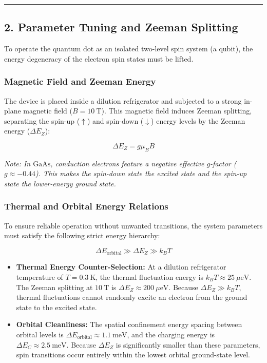 \documentclass[
]{article}
\providecommand{\tightlist}{%
  \setlength{\itemsep}{0pt}\setlength{\parskip}{0pt}}
\begin{document}
\begin{center}\rule{0.5\linewidth}{0.5pt}\end{center}

\subsection{2. Parameter Tuning and Zeeman
Splitting}\label{parameter-tuning-and-zeeman-splitting}

To operate the quantum dot as an isolated two-level spin system (a
qubit), the energy degeneracy of the electron spin states must be
lifted.

\subsubsection{Magnetic Field and Zeeman
Energy}\label{magnetic-field-and-zeeman-energy}

The device is placed inside a dilution refrigerator and subjected to a
strong in-plane magnetic field (\(B = 10\ \text{T}\)). This magnetic
field induces Zeeman splitting, separating the spin-up (\(\uparrow\))
and spin-down (\(\downarrow\)) energy levels by the Zeeman energy
(\(\Delta E_Z\)):

\[\Delta E_Z = g \mu_B B\]

\emph{Note: In \(\text{GaAs}\), conduction electrons feature a negative
effective \(g\)-factor (\(g \approx -0.44\)). This makes the spin-down
state the excited state and the spin-up state the lower-energy ground
state.}

\subsubsection{Thermal and Orbital Energy
Relations}\label{thermal-and-orbital-energy-relations}

To ensure reliable operation without unwanted transitions, the system
parameters must satisfy the following strict energy hierarchy:

\[\Delta E_{\text{orbital}} \gg \Delta E_Z \gg k_B T\]

\begin{itemize}
\tightlist
\item
  \textbf{Thermal Energy Counter-Selection:} At a dilution refrigerator
  temperature of \(T = 0.3\ \text{K}\), the thermal fluctuation energy
  is \(k_B T \approx 25\ \mu\text{eV}\). The Zeeman splitting at
  \(10\ \text{T}\) is \(\Delta E_Z \approx 200\ \mu\text{eV}\). Because
  \(\Delta E_Z \gg k_B T\), thermal fluctuations cannot randomly excite
  an electron from the ground state to the excited state.
\item
  \textbf{Orbital Cleanliness:} The spatial confinement energy spacing
  between orbital levels is
  \(\Delta E_{\text{orbital}} \approx 1.1\ \text{meV}\), and the
  charging energy is \(\Delta E_C \approx 2.5\ \text{meV}\). Because
  \(\Delta E_Z\) is significantly smaller than these parameters, spin
  transitions occur entirely within the lowest orbital ground-state
  level.
\end{itemize}
\end{document}
